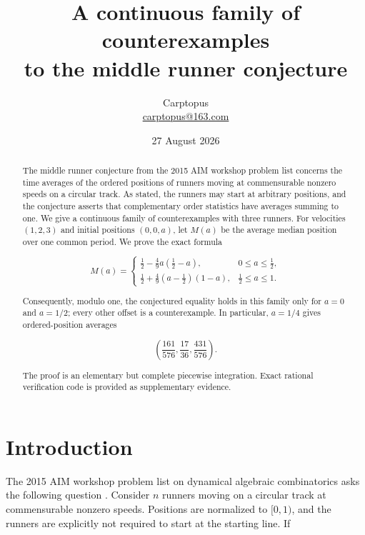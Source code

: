 \documentclass[11pt]{article}
\title{A continuous family of counterexamples\\
to the middle runner conjecture}
\author{Carptopus\\\href{mailto:carptopus@163.com}{carptopus@163.com}}
\date{27 August 2026}
\numberwithin{equation}{section}
\begin{document}
\maketitle

\begin{center}
\end{center}

\begin{abstract}


The middle runner conjecture from the 2015 AIM workshop problem list concerns
the time averages of the ordered positions of runners moving at commensurable
nonzero speeds on a circular track. As stated, the runners may start at
arbitrary positions, and the conjecture asserts that complementary order
statistics have averages summing to one. We give a continuous family of
counterexamples with three runners. For velocities $(1,2,3)$ and initial
positions $(0,0,a)$, let $M(a)$ be the average median position over one common
period. We prove the exact formula

\nopagebreak[4]
\[
M(a)=
\begin{cases}
\displaystyle \frac12-\frac49a\left(\frac12-a\right),
  &0\leq a\leq\frac12,\\[6pt]
\displaystyle \frac12+\frac49\left(a-\frac12\right)(1-a),
  &\frac12\leq a\leq1.
\end{cases}
\]

Consequently, modulo one, the conjectured equality holds in this family only
for $a=0$ and $a=1/2$; every other offset is a counterexample. In particular,
$a=1/4$ gives ordered-position averages

\nopagebreak[4]
\[
\left(\frac{161}{576},\frac{17}{36},\frac{431}{576}\right).
\]

The proof is an elementary but complete piecewise integration. Exact rational
verification code is provided as supplementary evidence.

\end{abstract}

\section{Introduction}


The 2015 AIM workshop problem list on dynamical algebraic combinatorics asks
the following question \cite[Section~2.1]{aim2015}. Consider $n$ runners moving on a
circular track at commensurable nonzero speeds. Positions are normalized to
$[0,1)$, and the runners are explicitly not required to start at the starting
line. If
\end{document}
